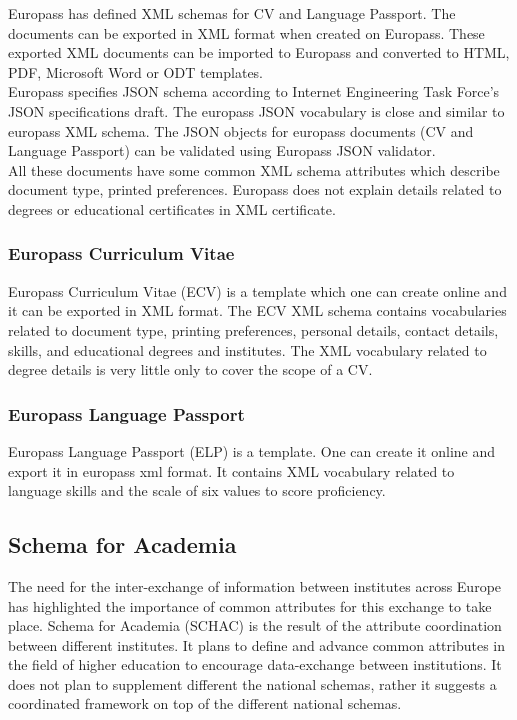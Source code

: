 \documentclass[12pt,a4paper,oneside]{book}
\begin{document}
    Europass has defined XML schemas for CV and Language Passport. The documents can be exported in XML format when created on Europass. These exported XML documents can be imported to Europass and converted to HTML, PDF, Microsoft Word or ODT templates. \\

    Europass specifies JSON schema according to Internet Engineering Task Force's JSON specifications draft. The europass JSON vocabulary is close and similar to europass XML schema. The JSON objects for europass documents (CV and Language Passport) can be validated using Europass JSON validator. \\

    All these documents have some common XML schema attributes which describe document type, printed preferences. Europass does not explain details related to degrees or educational certificates in XML certificate. 

        \subsubsection{Europass Curriculum Vitae}
        Europass Curriculum Vitae (ECV) is a template which one can create online and it can be exported in XML format. The ECV XML schema contains vocabularies related to document type, printing preferences, personal details, contact details, skills, and educational degrees and institutes. The XML vocabulary related to degree details is very little only to cover the scope of a CV. 

        \subsubsection{Europass Language Passport}
        Europass Language Passport (ELP) is a template. One can create it online and export it in europass xml format. It contains XML vocabulary related to language skills and the scale of six values to score proficiency. 

    \subsection{Schema for Academia \cite{SCHAC 1.5.0}} 
    The need for the inter-exchange of information between institutes across Europe has highlighted the importance of common attributes for this exchange to take place. Schema for Academia (SCHAC) is the result of the attribute coordination between different institutes. It plans to define and advance common attributes in the field of higher education to encourage data-exchange between institutions. It does not plan to supplement different the national schemas, rather it suggests a coordinated framework on top of the different national schemas. \\
    
\end{document}
